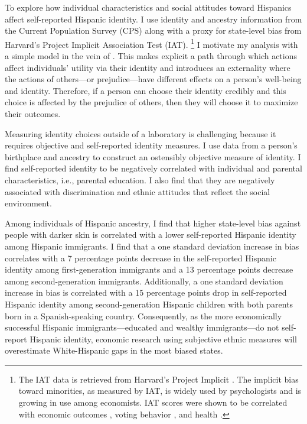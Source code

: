 \documentclass[12pt,english]{article}
\begin{document}
To explore how individual characteristics and social attitudes toward Hispanics affect self-reported Hispanic identity. I use identity and ancestry information from the Current Population Survey (CPS) along with a proxy for state-level bias from Harvard's Project Implicit Association Test (IAT). \footnote{The IAT data is retrieved from Harvard's Project Implicit \autocite{greenwaldMeasuringIndividualDifferences1998}. The implicit bias toward minorities, as measured by IAT, is widely used by psychologists and is growing in use among economists. IAT scores were shown to be correlated with economic outcomes \autocite{chettyRaceEconomicOpportunity2020,gloverDiscriminationSelfFulfillingProphecy2017}, voting behavior \autocite{friesePredictingVotingBehavior2007}, and health \autocite{leitnerRacialBiasAssociated2016}.} I motivate my analysis with a simple model in the vein of \textcite{akerlofEconomicsIdentity2000}. This makes explicit a path through which actions affect individuals' utility via their identity and introduces an externality where the actions of others---or prejudice---have different effects on a person's well-being and identity. Therefore, if a person can choose their identity credibly and this choice is affected by the prejudice of others, then they will choose it to maximize their outcomes.

Measuring identity choices outside of a laboratory is challenging because it requires objective and self-reported identity measures. I use data from a person's birthplace and ancestry to construct an ostensibly objective measure of identity. I find self-reported identity to be negatively correlated with individual and parental characteristics, i.e., parental education. I also find that they are negatively associated with discrimination and ethnic attitudes that reflect the social environment. 

Among individuals of Hispanic ancestry, I find that higher state-level bias against people with darker skin is correlated with a lower self-reported Hispanic identity among Hispanic immigrants. I find that a one standard deviation increase in bias correlates with a 7 percentage points decrease in the self-reported Hispanic identity among first-generation immigrants and a 13 percentage points decrease among second-generation immigrants. Additionally, a one standard deviation increase in bias is correlated with a 15 percentage points drop in self-reported Hispanic identity among second-generation Hispanic children with both parents born in a Spanish-speaking country. Consequently, as the more economically successful Hispanic immigrants---educated and wealthy immigrants---do not self-report Hispanic identity, economic research using subjective ethnic measures will overestimate White-Hispanic gaps in the most biased states. 
\end{document}

